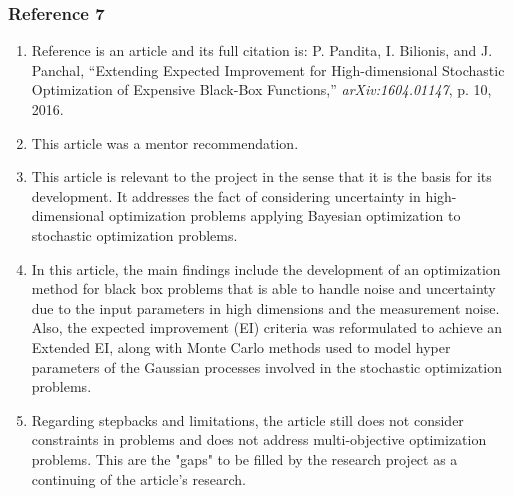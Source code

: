\documentclass{journal}
\begin{document}
\subsubsection{Reference 7}
\begin{enumerate}
	\item Reference \cite{Pandita2016} is an article and its full citation is: P. Pandita, I. Bilionis, and J. Panchal, “Extending Expected Improvement for High-dimensional Stochastic Optimization of Expensive Black-Box Functions,” \textit{arXiv:1604.01147}, p. 10, 2016.
	\item This article was a mentor recommendation.
	\item This article is relevant to the project in the sense that it is the basis for its development. It addresses the fact of considering uncertainty in high-dimensional optimization problems applying Bayesian optimization to stochastic optimization problems.
	\item In this article, the main findings include the development of an optimization method for black box problems that is able to handle noise and uncertainty due to the input parameters in high dimensions and the measurement noise. Also, the expected improvement (EI) criteria was reformulated to achieve an Extended EI, along with Monte Carlo methods used to model hyper parameters of the Gaussian processes involved in the stochastic optimization problems.
	\item Regarding stepbacks and limitations, the article still does not consider constraints in problems and does not address multi-objective optimization problems. This are the "gaps" to be filled by the research project as a continuing of the article's research.
\end{enumerate}
\end{document}
